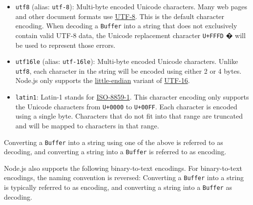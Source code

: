 \begin{itemize}
\item
  \texttt{\textquotesingle{}utf8\textquotesingle{}} (alias:
  \texttt{\textquotesingle{}utf-8\textquotesingle{}}): Multi-byte
  encoded Unicode characters. Many web pages and other document formats
  use \href{https://en.wikipedia.org/wiki/UTF-8}{UTF-8}. This is the
  default character encoding. When decoding a \texttt{Buffer} into a
  string that does not exclusively contain valid UTF-8 data, the Unicode
  replacement character \texttt{U+FFFD} � will be used to represent
  those errors.
\item
  \texttt{\textquotesingle{}utf16le\textquotesingle{}} (alias:
  \texttt{\textquotesingle{}utf-16le\textquotesingle{}}): Multi-byte
  encoded Unicode characters. Unlike
  \texttt{\textquotesingle{}utf8\textquotesingle{}}, each character in
  the string will be encoded using either 2 or 4 bytes. Node.js only
  supports the
  \href{https://en.wikipedia.org/wiki/Endianness}{little-endian} variant
  of \href{https://en.wikipedia.org/wiki/UTF-16}{UTF-16}.
\item
  \texttt{\textquotesingle{}latin1\textquotesingle{}}: Latin-1 stands
  for \href{https://en.wikipedia.org/wiki/ISO-8859-1}{ISO-8859-1}. This
  character encoding only supports the Unicode characters from
  \texttt{U+0000} to \texttt{U+00FF}. Each character is encoded using a
  single byte. Characters that do not fit into that range are truncated
  and will be mapped to characters in that range.
\end{itemize}

Converting a \texttt{Buffer} into a string using one of the above is
referred to as decoding, and converting a string into a \texttt{Buffer}
is referred to as encoding.

Node.js also supports the following binary-to-text encodings. For
binary-to-text encodings, the naming convention is reversed: Converting
a \texttt{Buffer} into a string is typically referred to as encoding,
and converting a string into a \texttt{Buffer} as decoding.

